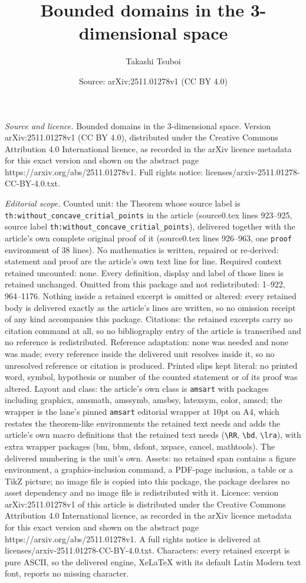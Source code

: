 \documentclass[10pt,a4paper]{amsart}
\title[Bounded domains in the 3-dimensional space]{Bounded domains in the 3-dimensional space}
\author{Takashi Tsuboi}
\date{Source: arXiv:2511.01278v1 (CC BY 4.0)}
\begin{document}
\maketitle

\noindent\emph{Source and licence.} Bounded domains in the 3-dimensional space. Version arXiv:2511.01278v1 (CC BY 4.0), distributed under the Creative Commons Attribution 4.0 International licence, as recorded in the arXiv licence metadata for this exact version and shown on the abstract page https://arxiv.org/abs/2511.01278v1. Full rights notice: licenses/arxiv-2511.01278-CC-BY-4.0.txt.\par\smallskip

\noindent\textit{Editorial scope.} Counted unit: the Theorem whose source label is \texttt{th:without\_concave\_critial\_points} in the article (source0.tex lines 923--925, source label \texttt{th:without\_concave\_critial\_points}), delivered together with the article's own complete original proof of it (source0.tex lines 926--963, one \texttt{proof} environment of 38 lines). No mathematics is written, repaired or re-derived: statement and proof are the article's own text line for line. Required context retained uncounted: none. Every definition, display and label of those lines is retained unchanged. Omitted from this package and not redistributed: 1--922, 964--1176. Nothing inside a retained excerpt is omitted or altered: every retained body is delivered exactly as the article's lines are written, so no omission receipt of any kind accompanies this package. Citations: the retained excerpts carry no citation command at all, so no bibliography entry of the article is transcribed and no reference is redistributed. Reference adaptation: none was needed and none was made; every reference inside the delivered unit resolves inside it, so no unresolved reference or citation is produced. Printed slips kept literal: no printed word, symbol, hypothesis or number of the counted statement or of its proof was altered. Layout and class: the article's own class is \texttt{amsart} with packages including graphicx, amsmath, amssymb, amsbsy, latexsym, color, amscd; the wrapper is the lane's pinned \texttt{amsart} editorial wrapper at 10pt on A4, which restates the theorem-like environments the retained text needs and adds the article's own macro definitions that the retained text needs (\texttt{\textbackslash RR}, \texttt{\textbackslash bd}, \texttt{\textbackslash lra}), with extra wrapper packages (bm, bbm, dsfont, xspace, cancel, mathtools). The delivered numbering is the unit's own. Assets: no retained span contains a figure environment, a graphics-inclusion command, a PDF-page inclusion, a table or a TikZ picture; no image file is copied into this package, the package declares no asset dependency and no image file is redistributed with it. Licence: version arXiv:2511.01278v1 of this article is distributed under the Creative Commons Attribution 4.0 International licence, as recorded in the arXiv licence metadata for this exact version and shown on the abstract page https://arxiv.org/abs/2511.01278v1. A full rights notice is delivered at licenses/arxiv-2511.01278-CC-BY-4.0.txt. Characters: every retained excerpt is pure ASCII, so the delivered engine, XeLaTeX with its default Latin Modern text font, reports no missing character.
\end{document}
